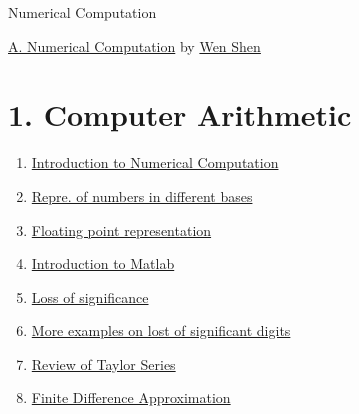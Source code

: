 \documentclass[11pt]{article}
\begin{document}
	\kaishu 
	\setcounter{section}{0}
	\begin{center}
		{\LARGE  Numerical Computation}
		
		
	\end{center}
\setcounter{page}{1}


\begin{center}
	{\Large \href{https://www.youtube.com/playlist?list=PLbxFfU5GKZz3D4NPYvvY7dvXiZ0awd4zn}{A. Numerical Computation}} {\large by \href{https://sites.psu.edu/wxs27/}{Wen Shen}}
\end{center}

\vspace{-1cm}

\section*{1. Computer Arithmetic}

\vspace{-0.5cm}

\begin{multicols}{2}
	\begin{enumerate}
		\item \href{https://mp.weixin.qq.com/s/cgsyPIr7w-fEbRACNE1ezg}{Introduction to Numerical Computation}	%
		\item \href{https://mp.weixin.qq.com/s/QCssJJjJ8xno2kND1BAYaA}{Repre. of numbers in different bases}	%
		\item \href{https://mp.weixin.qq.com/s/iWqrQSD0Gqr8DKG2GydUbQ}{Floating point representation}	%
		\item \href{https://mp.weixin.qq.com/s/9Tj0u32iptv76BmdE0pMOA}{Introduction to Matlab}	%
		\item \href{https://mp.weixin.qq.com/s/U4CjxHjiI_Xng5sTcorRVQ}{Loss of significance}	%
		\item \href{https://mp.weixin.qq.com/s/hny_RovdEhvd1qBYzPRr8g}{More examples on lost of significant digits}	%
		\item \href{https://mp.weixin.qq.com/s/VjbfnKxb1SXusT-z9vVFYw}{Review of Taylor Series}	%
		\item \href{https://mp.weixin.qq.com/s/sM24GvqIp8F-Q6NAfz0iGQ}{Finite Difference Approximation}	%
	\end{enumerate}
\end{multicols}
\end{document}
